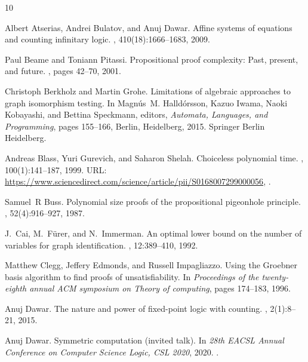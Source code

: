 \documentclass[10pt,a4paper]{article}
\begin{document}
\begin{thebibliography}{10}

Albert Atserias, Andrei Bulatov, and Anuj Dawar.
\newblock Affine systems of equations and counting infinitary logic.
, 410(18):1666--1683, 2009.

Paul Beame and Toniann Pitassi.
\newblock Propositional proof complexity: Past, present, and future.
, pages 42--70, 2001.

Christoph Berkholz and Martin Grohe.
\newblock Limitations of algebraic approaches to graph isomorphism testing.
\newblock In Magn{\'u}s~M. Halld{\'o}rsson, Kazuo Iwama, Naoki Kobayashi, and
  Bettina Speckmann, editors, {\em Automata, Languages, and Programming}, pages
  155--166, Berlin, Heidelberg, 2015. Springer Berlin Heidelberg.

Andreas Blass, Yuri Gurevich, and Saharon Shelah.
\newblock Choiceless polynomial time.
, 100(1):141--187, 1999.
\newblock URL:
  \url{https://www.sciencedirect.com/science/article/pii/S0168007299000056},
  \href {https://doi.org/10.1016/S0168-0072(99)00005-6}
  {}.

Samuel~R Buss.
\newblock Polynomial size proofs of the propositional pigeonhole principle.
, 52(4):916--927, 1987.

J.~Cai, M.~F{\"u}rer, and N.~Immerman.
\newblock An optimal lower bound on the number of variables for graph
  identification.
, 12:389--410, 1992.

Matthew Clegg, Jeffery Edmonds, and Russell Impagliazzo.
\newblock Using the {G}roebner basis algorithm to find proofs of
  unsatisfiability.
\newblock In {\em Proceedings of the twenty-eighth annual ACM symposium on
  Theory of computing}, pages 174--183, 1996.

Anuj Dawar.
\newblock The nature and power of fixed-point logic with counting.
, 2(1):8--21, 2015.

Anuj Dawar.
\newblock Symmetric computation (invited talk).
\newblock In {\em 28th {EACSL} Annual Conference on Computer Science Logic,
  {CSL} 2020}, 2020.
\newblock \href {https://doi.org/10.4230/LIPIcs.CSL.2020.2}
  {}.


\end{thebibliography}
\end{document}
